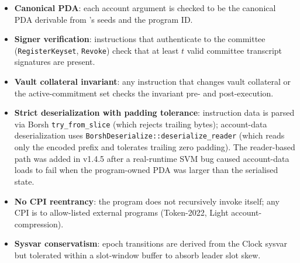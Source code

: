 \begin{itemize}[leftmargin=2em,itemsep=0pt]
  \item \textbf{Canonical PDA}: each account argument is checked to be the canonical PDA derivable from 's seeds and the program ID.
  \item \textbf{Signer verification}: instructions that authenticate to the committee (\texttt{RegisterKeyset}, \texttt{Revoke}) check that at least $t$ valid committee transcript signatures are present.
  \item \textbf{Vault collateral invariant}: any instruction that changes vault collateral or the active-commitment set checks the invariant pre- and post-execution.
  \item \textbf{Strict deserialization with padding tolerance}: instruction data is parsed via Borsh \texttt{try\_from\_slice} (which rejects trailing bytes); account-data deserialization uses \texttt{BorshDeserialize::deserialize\_reader} (which reads only the encoded prefix and tolerates trailing zero padding). The reader-based path was added in v1.4.5 after a real-runtime SVM bug caused account-data loads to fail when the program-owned PDA was larger than the serialised state.
  \item \textbf{No CPI reentrancy}: the program does not recursively invoke itself; any CPI is to allow-listed external programs (Token-2022, Light account-compression).
  \item \textbf{Sysvar conservatism}: epoch transitions are derived from the Clock sysvar but tolerated within a slot-window buffer to absorb leader slot skew.
\end{itemize}
